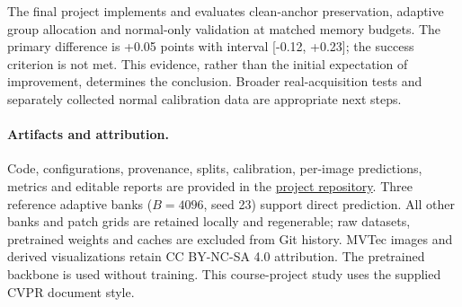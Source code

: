 \documentclass[10pt,twocolumn,letterpaper]{article}
\begin{document}
The final project implements and evaluates clean-anchor preservation, adaptive group allocation and normal-only validation at matched memory budgets. The primary difference is +0.05 points with interval [-0.12, +0.23]; the success criterion is not met. This evidence, rather than the initial expectation of improvement, determines the conclusion. Broader real-acquisition tests and separately collected normal calibration data are appropriate next steps.

\paragraph{Artifacts and attribution.}
Code, configurations, provenance, splits, calibration, per-image predictions, metrics and editable reports are provided in the \href{https://github.com/sarthak06shukla/clean-anchored-patchcore}{project repository}. Three reference adaptive banks ($B=4096$, seed 23) support direct prediction. All other banks and patch grids are retained locally and regenerable; raw datasets, pretrained weights and caches are excluded from Git history. MVTec images and derived visualizations retain CC BY-NC-SA 4.0 attribution. The pretrained backbone is used without training. This course-project study uses the supplied CVPR document style.

\clearpage
\balance
{\small{}}
\end{document}
